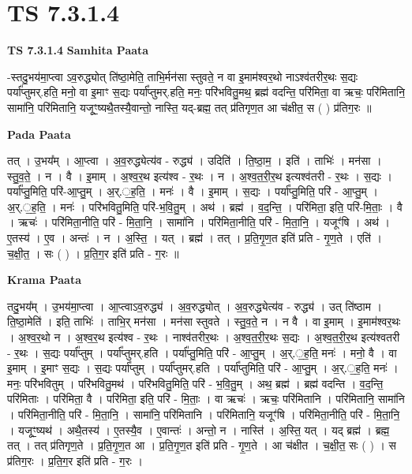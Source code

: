 \documentclass[17pt]{extarticle}
\begin{document}
\section{ TS 7.3.1.4 }

\textbf{TS 7.3.1.4 } \newline
\textbf{Samhita Paata} \newline

-स्तदु॒भय॑मा॒प्त्वा ऽव॒रुद्ध्योत् ति॑ष्ठा॒मेति॒ ताभि॒र्मन॑सा स्तुवते॒ न वा इ॒माम॑श्वर॒थो नाऽश्व॑तरीर॒थः स॒द्यः पर्या᳚प्तुमर्.हति॒ मनो॒ वा इ॒माꣳ स॒द्यः पर्या᳚प्तुमर्.हति॒ मनः॒ परि॑भवितु॒मथ॒ ब्रह्म॑ वदन्ति॒ परि॑मिता॒ वा ऋचः॒ परि॑मितानि॒ सामा॑नि॒ परि॑मितानि॒ यजूꣳ॒॒ष्यथै॒तस्यै॒वान्तो॒ नास्ति॒ यद्-ब्रह्म॒ तत् प्र॑तिगृण॒त आ च॑क्षीत॒ स ( ) प्र॑तिग॒रः ॥ \newline

\textbf{Pada Paata} \newline

तत् । उ॒भय᳚म् । आ॒प्त्वा । अ॒व॒रुद्ध्येत्य॑व - रुद्ध्य॑ । उदिति॑ । ति॒ष्ठा॒म॒ । इति॑ । ताभिः॑ । मन॑सा । स्तु॒व॒ते॒ । न । वै । इ॒माम् । अ॒श्व॒र॒थ इत्य॑श्व - र॒थः । न । अ॒श्व॒त॒री॒र॒थ इत्यश्व॑तरी - र॒थः । स॒द्यः । पर्या᳚प्तु॒मिति॒ परि॑-आ॒प्तु॒म् । अ॒र्.॒ह॒ति॒ । मनः॑ । वै । इ॒माम् । स॒द्यः । पर्या᳚प्तु॒मिति॒ परि॑ - आ॒प्तु॒म् । अ॒र्.॒ह॒ति॒ । मनः॑ । परि॑भवितु॒मिति॒ परि॑-भ॒वि॒तु॒म् । अथ॑ । ब्रह्म॑ । व॒द॒न्ति॒ । परि॑मिता॒ इति॒ परि॑-मि॒ताः॒ । वै । ऋचः॑ । परि॑मिता॒नीति॒ परि॑ - मि॒ता॒नि॒ । सामा॑नि । परि॑मिता॒नीति॒ परि॑ - मि॒ता॒नि॒ । यजूꣳ॑षि । अथ॑ । ए॒तस्य॑ । ए॒व । अन्तः॑ । न । अ॒स्ति॒ । यत् । ब्रह्म॑ । तत् । प्र॒ति॒गृ॒ण॒त इति॑ प्रति - गृ॒ण॒ते । एति॑ । च॒क्षी॒त॒ । सः ( ) । प्र॒ति॒ग॒र इति॑ प्रति - ग॒रः ॥  \newline


\textbf{Krama Paata} \newline

तदु॒भय᳚म् । उ॒भय॑मा॒प्त्वा । आ॒प्त्वाऽव॒रुद्ध्य॑ । अ॒व॒रुद्ध्योत् । अ॒व॒रुद्ध्येत्य॑व - रुद्ध्य॑ । उत् ति॑ष्ठाम । ति॒ष्ठा॒मेति॑ । इति॒ ताभिः॑ । ताभि॒र् मन॑सा । मन॑सा स्तुवते । स्तु॒व॒ते॒ न । न वै । वा इ॒माम् । इ॒माम॑श्वर॒थः । अ॒श्व॒र॒थो न । अ॒श्व॒र॒थ इत्य॑श्व - र॒थः । नाश्व॑तरीर॒थः । अ॒श्व॒त॒री॒र॒थः स॒द्यः । अ॒श्व॒त॒री॒र॒थ इत्य॑श्वतरी - र॒थः । स॒द्यः पर्या᳚प्तुम् । पर्या᳚प्तुमर्.हति । पर्या᳚प्तु॒मिति॒ परि॑ - आ॒प्तु॒म् । अ॒र्.॒ह॒ति॒ मनः॑ । मनो॒ वै । वा इ॒माम् । इ॒माꣳ स॒द्यः । स॒द्यः पर्या᳚प्तुम् । पर्या᳚प्तुमर्.हति । पर्या᳚प्तुमिति॒ परि॑ - आ॒प्तु॒म् । अ॒र्.॒ह॒ति॒ मनः॑ । मनः॒ परि॑भवितुम् । परि॑भवितु॒मथ॑ । परि॑भवितु॒मिति॒ परि॑ - भ॒वि॒तु॒म् । अथ॒ ब्रह्म॑ । ब्रह्म॑ वदन्ति । व॒द॒न्ति॒ परि॑मिताः । परि॑मिता॒ वै । परि॑मिता॒ इति॒ परि॑ - मि॒ताः॒ । वा ऋचः॑ । ऋचः॒ परि॑मितानि । परि॑मितानि॒ सामा॑नि । परि॑मिता॒नीति॒ परि॑ - मि॒ता॒नि॒ । सामा॑नि॒ परि॑मितानि । परि॑मितानि॒ यजूꣳ॑षि । परि॑मिता॒नीति॒ परि॑ - मि॒ता॒नि॒ । यजूꣳ॒॒ष्यथ॑ । अथै॒तस्य॑ । ए॒तस्यै॒व । ए॒वान्तः॑ । अन्तो॒ न । नास्ति॑ । अ॒स्ति॒ यत् । यद् ब्रह्म॑ । ब्रह्म॒ तत् । तत् प्र॑तिगृण॒ते । प्र॒ति॒गृ॒ण॒त आ । प्र॒ति॒गृ॒ण॒त इति॑ प्रति - गृ॒ण॒ते । आ च॑क्षीत । च॒क्षी॒त॒ सः ( ) । स प्र॑तिग॒रः । प्र॒ति॒ग॒र इति॑ प्रति - ग॒रः । \newline
\end{document}
